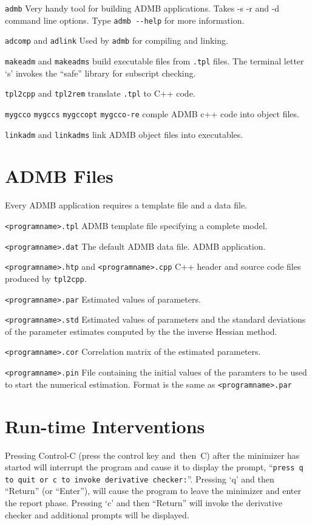 \verb+admb+ Very handy tool for building ADMB applications. 
Takes -s -r and -d command line
options. Type \verb+admb --help+ for more information.

\verb+adcomp+ and \verb+adlink+ Used by \verb+admb+ for compiling and
linking.

\verb+makeadm+ and \verb+makeadms+ build executable files from 
\verb+.tpl+ files. The terminal letter `s' invokes the ``safe''
library for subscript checking.

\verb+tpl2cpp+ and \verb+tpl2rem+ translate \verb+.tpl+ to C++ code.

\verb+mygcco+ \verb+mygccs+ \verb+mygccopt+ \verb+mygcco-re+ comple
ADMB c++ code into object files.

\verb+linkadm+ and \verb+linkadms+ link ADMB object files into
executables.

\section {ADMB Files}
Every ADMB application requires a template file and a data file.

\verb+<programname>.tpl+ ADMB template file specifying a complete
model.

\verb+<programname>.dat+ The default ADMB data file.
ADMB application.

\verb+<programname>.htp+ and \verb+<programname>.cpp+ C++ header and
source code files produced by \verb+tpl2cpp+.

\verb+<programname>.par+ Estimated values of parameters.

\verb+<programname>.std+ Estimated values of parameters and the
standard deviations of the parameter estimates computed by the the inverse
Hessian method.

\verb+<programname>.cor+ Correlation matrix of the estimated
parameters.

\verb+<programname>.pin+ File containing the initial values of the
paramters to be used to start the numerical estimation. Format is the
same as \verb+<programname>.par+ 

\section{Run-time Interventions}
Pressing Control-C (press the control key and~then~C) after the
minimizer has started will interrupt the program and cause it to
display the prompt, 
``\verb|press q to quit or c to invoke derivative checker:|''.
Pressing `q' and then ``Return'' (or ``Enter''), will cause the
program to leave the minimizer and enter the report phase. Pressing
`c' and then ``Return'' will invoke the derivative checker and
additional prompts will be displayed.


